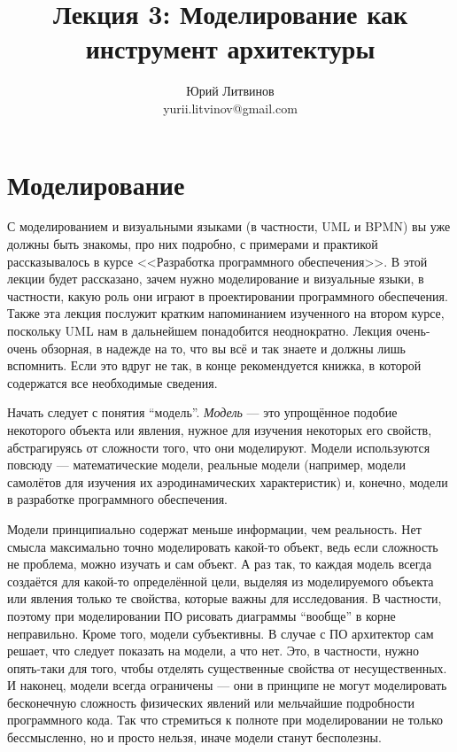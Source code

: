 \documentclass[a5paper]{article}
\title{Лекция 3: Моделирование как инструмент архитектуры}
\author{Юрий Литвинов\\\small{yurii.litvinov@gmail.com}}
\date{}
\begin{document}
\maketitle
\thispagestyle{empty}

\section{Моделирование}

С моделированием и визуальными языками (в частности, UML и BPMN) вы уже должны быть знакомы, про них подробно, с примерами и практикой рассказывалось в курсе <<Разработка программного обеспечения>>. В этой лекции будет рассказано, зачем нужно моделирование и визуальные языки, в частности, какую роль они играют в проектировании программного обеспечения. Также эта лекция послужит кратким напоминанием изученного на втором курсе, поскольку UML нам в дальнейшем понадобится неоднократно. Лекция очень-очень обзорная, в надежде на то, что вы всё и так знаете и должны лишь вспомнить. Если это вдруг не так, в конце рекомендуется книжка, в которой содержатся все необходимые сведения.

Начать следует с понятия ``модель''. \textit{Модель} --- это упрощённое подобие некоторого объекта или явления, нужное для изучения некоторых его свойств, абстрагируясь от сложности того, что они моделируют. Модели используются повсюду --- математические модели, реальные модели (например, модели самолётов для изучения их аэродинамических характеристик) и, конечно, модели в разработке программного обеспечения.

Модели принципиально содержат меньше информации, чем реальность. Нет смысла максимально точно моделировать какой-то объект, ведь если сложность не проблема, можно изучать и сам объект. А раз так, то каждая модель всегда создаётся для какой-то определённой цели, выделяя из моделируемого объекта или явления только те свойства, которые важны для исследования. В частности, поэтому при моделировании ПО рисовать диаграммы ``вообще'' в корне неправильно. Кроме того, модели субъективны. В случае с ПО архитектор сам решает, что следует показать на модели, а что нет. Это, в частности, нужно опять-таки для того, чтобы отделять существенные свойства от несущественных. И наконец, модели всегда ограничены --- они в принципе не могут моделировать бесконечную сложность физических явлений или мельчайшие подробности программного кода. Так что стремиться к полноте при моделировании не только бессмысленно, но и просто нельзя, иначе модели станут бесполезны.
\end{document}
